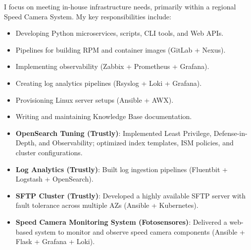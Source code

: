 \documentclass[10pt,a4paper]{altacv}
\begin{document}
\divider


I focus on meeting in-house infrastructure needs, primarily within a regional Speed Camera System. My key responsibilities include:

\bigskip

\begin{itemize}
    \item Developing Python microservices, scripts, CLI tools, and Web APIs.
    \item Pipelines for building RPM and container images (GitLab + Nexus).  
    \item Implementing observability (Zabbix + Prometheus + Grafana).  
    \item Creating log analytics pipelines (Rsyslog + Loki + Grafana).  
    \item Provisioning Linux server setups (Ansible + AWX).  
    \item Writing and maintaining Knowledge Base documentation.  
\end{itemize}




\begin{itemize}
    \item \textbf{OpenSearch Tuning (Trustly)}: Implemented Least Privilege, Defense-in-Depth, and Observability; optimized index templates, ISM policies, and cluster configurations.
    \item \textbf{Log Analytics (Trustly)}: Built log ingestion pipelines (Fluentbit + Logstash + OpenSearch).
    \item \textbf{SFTP Cluster (Trustly)}: Developed a highly available SFTP server with fault tolerance across multiple AZs (Ansible + Kubernetes).
    \item \textbf{Speed Camera Monitoring System (Fotosensores)}: Delivered a web-based system to monitor and observe speed camera components (Ansible + Flask + Grafana + Loki).
\end{itemize}

\clearpage
\end{document}
